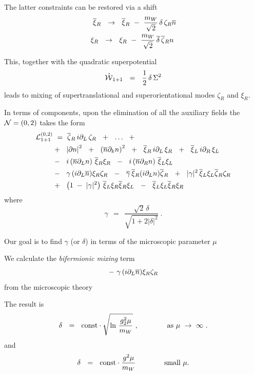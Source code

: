 \documentclass[12pt,letterpaper,landscape,KOMA,smallheadings,calcdimensions,display]{powersem}
\newcommand{\bxir}{\ov{\xi}{}_R}
\newcommand{\bxil}{\ov{\xi}{}_L}
\newcommand{\xir}{\xi_R}
\newcommand{\xil}{\xi_L}
\newcommand{\bzr}{\ov{\zeta}{}_R}
\newcommand{\zr}{\zeta_R}
\newcommand{\nbar}{\ov{n}}
\begin{document}
\begin{slide}
	
	The latter constraints can be restored via a shift
\begin{align*}
%
	\bxir ~~\to~~ \bxir ~-~ \frac{m_W}{\sqrt{2}}\, \delta\,\zeta_R\ov{n} \\
%
	\xi_R ~~\to~~ \xi_R ~-~ \frac{m_W}{\sqrt{2}}\, \ov{\delta}\, \bzr n~
\end{align*}

	This, together with the quadratic superpotential 
\[
	\hat{\mathcal{W}}{}_{1+1}  ~~=~~ \frac{1}{2} \, \delta \, \Sigma^2
\]
	leads to mixing of supertranslational and superorientational modes $ \zr $ and $ \xir $.

\end{slide}


\begin{slide}
	In terms of components, upon the elimination 
	of all the auxiliary fields the $\mathcal{N}=(0,2)$ takes the form
\begin{align*}
%
\notag
\mc{L}_{1+1}^{(0,2)} &~=~ 
	\bzr\, i\p_L\, \zr ~~+~~ \dots ~~+~~
	\\
%
\notag
	&
	+~~
	\left|\p n\right|^2 ~~+~~ \left(\ov{n}\p_k n\right)^2 ~~+~~
	\bxir \, i\p_L \, \xir  ~~+~~ \bxil \, i\p_R \, \xil 
	\\
%
\notag
	&
	-~~
	i \left(\ov{n}\p_L n\right)\, \bxir \xir ~~-~~ 
	i \left(\ov{n}\p_R n\right)\, \bxil \xil 
	\\
%
\notag
	&
	-~~
	\gamma\, (i\p_L\nbar) \xir\zr ~~-~~ \ov{\gamma}\, \bxir (i\p_L n) \bzr ~~+~~
	|\gamma|^2\, \bxil\xil \bzr\zr 
	\\
%
\notag
	&
	+~~ 
	\left( 1 \;-\; |\gamma|^2 \right)\, \bxil\xir \bxir\xil  
	~~-~~ \bxil\xil \bxir\xir
\end{align*}
	where
\[
	\gamma ~~=~~ \frac { \sqrt{2}\,\delta } { \sqrt{ 1 +  2 |\delta|^2 } }~.
\]

	Our goal is to find $ \gamma $ (or $ \delta $) in terms of the microscopic parameter $ \mu $
\end{slide}

\begin{slide}

	We calculate the \emph{bifermionic mixing} term 
\[
	-~\gamma\, (i\p_L\nbar) \xir\zr
\]
	from the microscopic theory

	The result is
\[
	\delta~~=~~ {\rm const} \cdot \sqrt{\ln\, \frac{g_2^2\mu}{m_W}}~,
	\qquad\qquad \text{as $\mu ~\to~ \infty$}~.
\]
	and
\[
	\delta~~=~~ {\rm const} \cdot \frac{g^2\mu}{m_W} \qquad\qquad \text{small $\mu$.}
\]
\end{slide}
\end{document}
